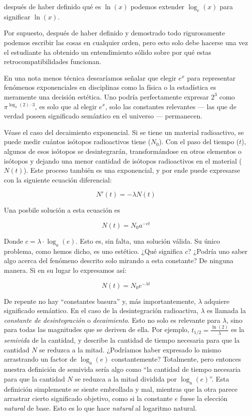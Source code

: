 después de haber definido qué es $\ln(x)$ podemos extender $\log_e(x)$ para significar $\ln(x)$.

Por supuesto, después de haber definido y demostrado todo rigurosamente podemos escribir las cosas en cualquier orden, pero esto solo debe hacerse una vez el estudiante ha obtenido un entendimiento sólido sobre por qué estas retrocompatibilidades funcionan.

En una nota menos técnica desearíamos señalar que elegir $e^x$ para representar fenómenos exponenciales en disciplinas como la física o la estadística es meramente una decisión estética. Uno podría perfectamente expresar $2^3$ como $\pi^{\log_{\pi}(2)\cdot 3}$, es solo que al elegir $e^x$, solo las constantes relevantes --- las que de verdad poseen significado semántico en el universo --- permanecen.

\newpage

Véase el caso del decaimiento exponencial. Si se tiene un material radioactivo, se puede medir cuántos isótopos radioactivos tiene ($N_0$). Con el paso del tiempo ($t$), algunos de esos isótopos se desintegrarán, transformándose en otros elementos o isótopos y dejando una menor cantidad de isótopos radioactivos en el material ($N(t)$). Este proceso también es una exponencial, y por ende puede expresarse con la siguiente ecuación diferencial:

$$N'(t) = -\lambda N(t)$$

Una posbile solución a esta ecuación es

$$N(t) = N_0 a^{-ct}$$

Donde $c = \lambda \cdot \log_a(e)$. Esto es, sin falta, una solución válida. Su único problema, como hemos dicho, es uno estético. ¿Qué significa $c$? ¿Podría uno saber algo acerca del fenómeno descrito solo mirando a esta constante? De ninguna manera. Si en su lugar lo expresamos así:

$$N(t) = N_0 e^{-\lambda t}$$

De repente no hay \enquote{constantes basura} y, más importantemente, $\lambda$ adquiere significado semántico. En el caso de la desintegración radioactiva, $\lambda$ es llamada la \textit{constante de desintegración} o \textit{decaimiento}. Esto no solo es relevante para $\lambda$, sino para todas las magnitudes que se deriven de ella. Por ejemplo, $t_{1/2} = \frac{\ln(2)}{\lambda}$ es la \textit{semivida} de la cantidad, y describe la cantidad de tiempo necesaria para que la cantidad $N$ se reduzca a la mitad. ¿Podríamos haber expresado lo mismo arrastrando un factor de $\log_a(e)$ constantemente? Totalmente, pero entonces nuestra definición de semivida sería algo como \enquote{la cantidad de tiempo necesaria para que la cantidad $N$ se reduzca a la mitad dividida por $\log_a(e)$}. Esta definición simplemente se siente embrollada y mal, mientras que la otra parece arrastrar cierto significado objetivo, como si la constante $e$ fuese la elección \textit{natural} de base. Esto es lo que hace \textit{natural} al logaritmo natural.

